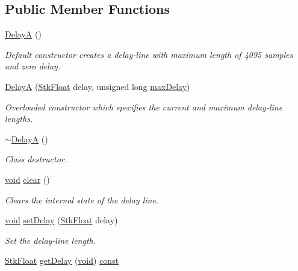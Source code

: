 \subsection*{Public Member Functions}
\begin{DoxyCompactItemize}
\item 
\hyperlink{class_nyq_1_1_delay_a_a444d21b9abc354dbf1b6344e3bbc37e2}{DelayA} ()
\begin{DoxyCompactList}\small\item\em Default constructor creates a delay-\/line with maximum length of 4095 samples and zero delay. \end{DoxyCompactList}\item 
\hyperlink{class_nyq_1_1_delay_a_ae9c73faf4a0e72f29f1a42420d9673aa}{DelayA} (\hyperlink{namespace_nyq_a044fa20a706520a617bbbf458a7db7e4}{Stk\+Float} delay, unsigned long \hyperlink{_pit_shift_8cpp_a1c8f8a7c16de309a72f07cddd0de0eb2}{max\+Delay})
\begin{DoxyCompactList}\small\item\em Overloaded constructor which specifies the current and maximum delay-\/line lengths. \end{DoxyCompactList}\item 
\hyperlink{class_nyq_1_1_delay_a_a1e3e7fff45c455e6085aea18f44e2d89}{$\sim$\+DelayA} ()
\begin{DoxyCompactList}\small\item\em Class destructor. \end{DoxyCompactList}\item 
\hyperlink{sound_8c_ae35f5844602719cf66324f4de2a658b3}{void} \hyperlink{class_nyq_1_1_delay_a_afd80c94dee3df9b016af72b909ace5d5}{clear} ()
\begin{DoxyCompactList}\small\item\em Clears the internal state of the delay line. \end{DoxyCompactList}\item 
\hyperlink{sound_8c_ae35f5844602719cf66324f4de2a658b3}{void} \hyperlink{class_nyq_1_1_delay_a_a33f8f510fb7da23e046d7aa143fdac7f}{set\+Delay} (\hyperlink{namespace_nyq_a044fa20a706520a617bbbf458a7db7e4}{Stk\+Float} delay)
\begin{DoxyCompactList}\small\item\em Set the delay-\/line length. \end{DoxyCompactList}\item 
\hyperlink{namespace_nyq_a044fa20a706520a617bbbf458a7db7e4}{Stk\+Float} \hyperlink{class_nyq_1_1_delay_a_aa44e8298d252c7a731a3144f044c66e0}{get\+Delay} (\hyperlink{sound_8c_ae35f5844602719cf66324f4de2a658b3}{void}) \hyperlink{getopt1_8c_a2c212835823e3c54a8ab6d95c652660e}{const} 

\end{DoxyCompactItemize}
